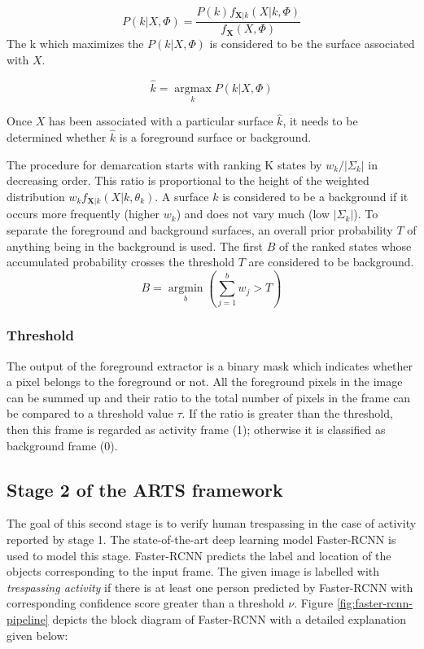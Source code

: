 $$ P(k|X,\Phi) = \frac{P(k)f_{\mathbf{X}|k}(X|k,\Phi)}{f_\mathbf{X}(X,\Phi)} $$
The k which maximizes the $P(k|X,\Phi) $ is considered to be the surface associated with $X$.

$$ \hat{k}=\operatorname*{argmax}_k P(k|X,\Phi)$$

Once $X$ has been associated with a particular surface $\hat{k}$, it needs to be determined whether $\hat{k}$ is a foreground surface or background. 

The procedure for demarcation starts with ranking K states by $w_k / | \Sigma_k |$ in decreasing order. This ratio is proportional to the height of the weighted distribution $w_k f_{\mathbf{X}|k}(X|k,\theta_k)$. A surface $k$ is considered to be a background if it occurs more frequently (higher $w_k$) and does not vary much (low $|\Sigma_k|$).  To separate the foreground and background surfaces, an overall prior probability $T$ of anything being in the background is used. The first $B$ of the ranked  states whose accumulated probability crosses the threshold $T$ are considered to be background. 
$$ B=\operatorname*{argmin}_b (\sum_{j=1}^b w_{j} > T)$$ 

\subsubsection{Threshold}
The output of the foreground extractor is a binary mask which indicates whether a pixel belongs to the foreground or not. All the foreground pixels in the image can be summed up and their ratio to the total number of pixels in the frame can be compared to a threshold value $\tau$. If the ratio is greater than the threshold, then this frame is regarded as activity frame (1); otherwise it is classified as background frame (0). 


\subsection{Stage 2 of the ARTS framework}
\label{sec:stage2}
The goal of this second stage is to verify human trespassing in the case of activity reported by stage 1. The state-of-the-art deep learning model Faster-RCNN\cite{ref_fasterrcnn} is used to model this stage. Faster-RCNN predicts the label and location of the objects corresponding to the input frame. The given image is labelled with \textit{trespassing activity} if there is at least one person predicted by Faster-RCNN with corresponding confidence score greater than a threshold $\nu$. Figure \ref{fig:faster-rcnn-pipeline} depicts the block diagram of Faster-RCNN with a detailed explanation given below: 


